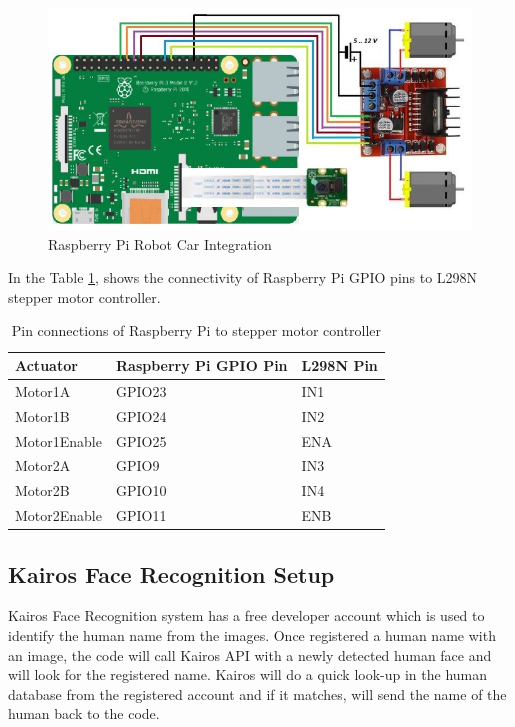 \documentclass[sigconf]{acmart}
\begin{document}
\begin{figure}[htb]
  \includegraphics[width=1.0\columnwidth]{images/RaspPi_Robot.jpg}
  \caption{Raspberry Pi Robot Car Integration}\label{F:circuit}
\end{figure}
In the Table \ref{T:pinlayout}, shows the connectivity of Raspberry Pi GPIO pins to L298N stepper motor controller.

\begin{table}[htb]
\caption{Pin connections of Raspberry Pi to stepper motor controller}\label{T:pinlayout}
\begin{tabular}{lll}
Actuator & Raspberry Pi GPIO Pin & L298N Pin \\
\hline
    Motor1A & GPIO23 & IN1 \\
    Motor1B & GPIO24 & IN2 \\
    Motor1Enable & GPIO25 & ENA \\
    Motor2A & GPIO9 & IN3 \\
    Motor2B & GPIO10 & IN4 \\
    Motor2Enable & GPIO11 & ENB \\
\end{tabular}
\end{table}


\subsection{Kairos Face Recognition Setup}
Kairos Face Recognition system has a free developer account which is used to identify the human name from the images. Once registered a human name with an image, the code will call Kairos API with a newly detected human face and will look for the registered name. Kairos will do a quick look-up in the human database from the registered account and if it matches, will send the name of the human back to the code.
\end{document}
